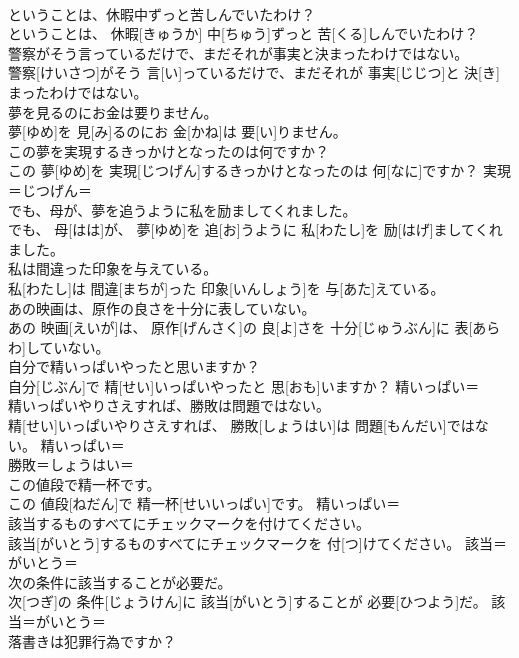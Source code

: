 \documentclass[8pt]{extreport}
\begin{document}
\begin{CJK}{UTF8}{min}
\\	ということは、休暇中ずっと苦しんでいたわけ？	
\\	ということは、 休暇[きゅうか] 中[ちゅう]ずっと 苦[くる]しんでいたわけ？	
\\	警察がそう言っているだけで、まだそれが事実と決まったわけではない。	
\\	警察[けいさつ]がそう 言[い]っているだけで、まだそれが 事実[じじつ]と 決[き]まったわけではない。	
\\	夢を見るのにお金は要りません。	
\\	夢[ゆめ]を 見[み]るのにお 金[かね]は 要[い]りません。	
\\	この夢を実現するきっかけとなったのは何ですか？	
\\	この 夢[ゆめ]を 実現[じつげん]するきっかけとなったのは 何[なに]ですか？	実現＝じつげん＝ 
\\	でも、母が、夢を追うように私を励ましてくれました。	
\\	でも、 母[はは]が、 夢[ゆめ]を 追[お]うように 私[わたし]を 励[はげ]ましてくれました。	
\\	私は間違った印象を与えている。	
\\	私[わたし]は 間違[まちが]った 印象[いんしょう]を 与[あた]えている。	
\\	あの映画は、原作の良さを十分に表していない。	
\\	あの 映画[えいが]は、 原作[げんさく]の 良[よ]さを 十分[じゅうぶん]に 表[あらわ]していない。	
\\	自分で精いっぱいやったと思いますか？	
\\	自分[じぶん]で 精[せい]いっぱいやったと 思[おも]いますか？	精いっぱい＝ 
\\	精いっぱいやりさえすれば、勝敗は問題ではない。	
\\	精[せい]いっぱいやりさえすれば、 勝敗[しょうはい]は 問題[もんだい]ではない。	精いっぱい＝ 
\\	勝敗＝しょうはい＝ 
\\	この値段で精一杯です。	
\\	この 値段[ねだん]で 精一杯[せいいっぱい]です。	精いっぱい＝ 
\\	該当するものすべてにチェックマークを付けてください。	
\\	該当[がいとう]するものすべてにチェックマークを 付[つ]けてください。	該当＝がいとう＝ 
\\	次の条件に該当することが必要だ。	
\\	次[つぎ]の 条件[じょうけん]に 該当[がいとう]することが 必要[ひつよう]だ。	該当＝がいとう＝ 
\\	落書きは犯罪行為ですか？	

\end{CJK}
\end{document}

